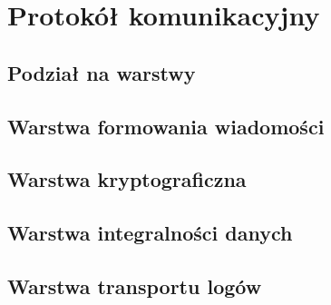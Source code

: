\chapter{Protokół komunikacyjny}
\label{chap:ProtKom}

\section[Podział na warstwy][Podział na warstwy]{Podział na warstwy}

\section[Warstwa formowania wiadomości][Warstwa formowania wiadomości]{Warstwa formowania wiadomości}

\section[Warstwa kryptograficzna][Warstwa kryptograficzna]{Warstwa kryptograficzna}

\section[Warstwa integralności][Warstwa integralności danych]{Warstwa integralności danych}

\section[Warstwa transportu logów][Warstwa transportu logów]{Warstwa transportu logów}





